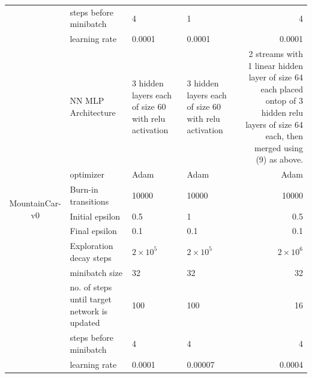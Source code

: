 \documentclass[12pt]{article}
\begin{document}
\begin{tcolorbox}[fit,height=22cm, width=\textwidth, blank, borderline={1pt}{-2pt},nobeforeafter]
\begin{table}[H]
\begin{tabular}{|c|p{7.785em}|l|l|r|}
			\cline{2-5}          & steps before minibatch & 4     & 1     & 4 \\
			\cline{2-5}          & learning rate & 0.0001 & 0.0001 &  0.0001 \\
			\hline
			\multirow{10}[20]{*}{\begin{sideways}MountainCar-v0\end{sideways}} & NN MLP Architecture  & \multicolumn{1}{p{7.93em}|}{3 hidden layers each of size 60 with relu activation} & \multicolumn{1}{p{7.93em}|}{3 hidden layers each of size 60 with relu activation} & \multicolumn{1}{p{7.93em}|}{2 streams with 1 linear hidden layer of size 64 each placed ontop of 3 hidden relu layers of size 64 each, then merged using (9) as above.} \\
			\cline{2-5}          & optimizer & \multicolumn{1}{p{7.93em}|}{Adam} & \multicolumn{1}{p{7.93em}|}{Adam} & \multicolumn{1}{p{7.93em}|}{Adam} \\
			\cline{2-5}          & Burn-in transitions & 10000 & 10000 & 10000 \\
			\cline{2-5}          & Initial epsilon & 0.5   & 1     & 0.5  \\
			\cline{2-5}          & Final epsilon & 0.1   & 0.1   &  0.1 \\
			\cline{2-5}          & Exploration decay steps & \multicolumn{1}{p{7.93em}|}{$2\times10^5$} & \multicolumn{1}{p{7.93em}|}{$2\times10^5$} & \multicolumn{1}{p{7.93em}|}{$2\times10^6$} \\
			\cline{2-5}          & minibatch size & 32    & 32    & 32 \\
			\cline{2-5}          & no. of steps until target network is updated & 100   & 100   & 16 \\
			\cline{2-5}          & steps before minibatch & 4     & 4     & 4 \\
			\cline{2-5}          & learning rate & 0.0001 & 0.00007 & 0.0004 \\
			\hline
		\end{tabular}%
		\label{tab1}%
	\end{table}%
     
    \end{tcolorbox}
\end{document}
